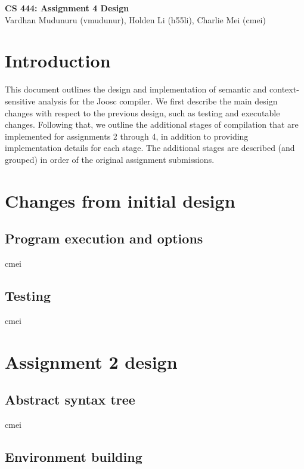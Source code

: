\documentclass[12pt]{article}
\begin{document}
\begin{center}
  \textbf{\Large{CS 444: Assignment 4 Design}} \\
  \vspace{5pt}
  Vardhan Mudunuru (vmudunur), Holden Li (h55li), Charlie Mei (cmei) \\
\end{center}
\vspace{5pt}

\section*{Introduction}

This document outlines the design and implementation of semantic and
context-sensitive analysis for the Joosc compiler. We first describe the main
design changes with respect to the previous design, such as testing and
executable changes. Following that, we outline the additional stages of
compilation that are implemented for assignments 2 through 4, in addition to
providing implementation details for each stage. The additional stages are
described (and grouped) in order of the original assignment submissions.

\section{Changes from initial design}

\subsection{Program execution and options}
cmei

\subsection{Testing}
cmei

\section{Assignment 2 design}

\subsection{Abstract syntax tree}
cmei

\subsection{Environment building}
\end{document}
